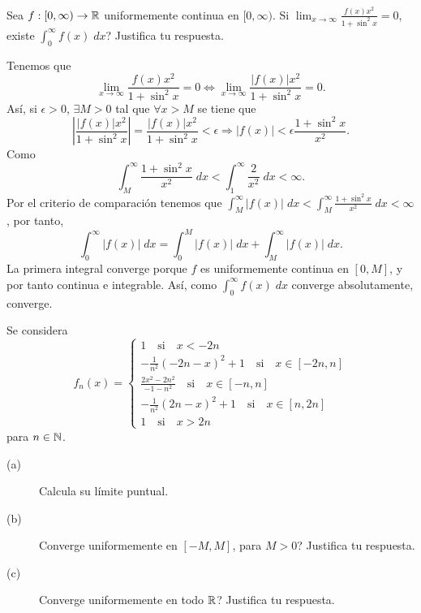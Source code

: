 \documentclass{article}
\begin{document}
\begin{ej}
Sea $\displaystyle f : [0,\infty) \to \mathbb{R} $ uniformemente continua en $\displaystyle [0,\infty) $. Si $\displaystyle \lim_{x \to \infty}\frac{f\left(x\right)x^{2}}{1 + \sin ^{2}x} = 0 $, existe $\displaystyle \int^{\infty}_{0} f\left(x\right) \; dx $? Justifica tu respuesta.
\end{ej}
\begin{sol}
Tenemos que 
\[\lim_{x \to \infty}\frac{f\left(x\right)x^{2}}{1+\sin ^{2}x } = 0 \iff \lim_{x \to \infty}\frac{ \left|f\left(x\right)\right|x^{2}}{1+ \sin ^{2}x} = 0 .\]
Así, si $\displaystyle \epsilon > 0 $, $\displaystyle \exists M > 0 $ tal que $\displaystyle \forall x > M $ se tiene que 
\[ \left|\frac{ \left|f\left(x\right)\right|x^{2}}{1+\sin ^{2}x}\right| = \frac{ \left|f\left(x\right)\right|x^{2}}{1+\sin ^{2}x} < \epsilon \Rightarrow \left|f\left(x\right)\right| < \epsilon \frac{1+ \sin ^{2}x}{x^{2}}.\]
Como 
\[\int^{\infty}_{M} \frac{1 + \sin ^{2}x}{x^{2}} \; dx < \int^{\infty}_{1} \frac{2}{x^{2}} \; dx < \infty .\]
Por el criterio de comparación tenemos que $\displaystyle \int^{\infty}_{M} \left|f\left(x\right)\right| \; dx < \int^{\infty}_{M} \frac{1+\sin ^{2}x}{x^{2}} \; dx < \infty $, por tanto, 
\[\int^{\infty}_{0} \left|f\left(x\right)\right| \; dx = \int^{M}_{0} \left|f\left(x\right)\right| \; dx + \int^{\infty}_{M} \left|f\left(x\right)\right| \; dx .\]
La primera integral converge porque $\displaystyle f $ es uniformemente continua en $\displaystyle [0,M] $, y por tanto continua e integrable. Así, como $\displaystyle \int^{\infty}_{0} f\left(x\right) \; dx $ converge absolutamente, converge.
\end{sol}
\begin{ej}
Se considera 
\[f_{n}\left(x\right) = 
\begin{cases}
1 \quad \text{si} \quad x < - 2n \\
-\frac{1}{n^{2}}\left(-2n-x\right)^{2}+1 \quad \text{si} \quad x \in \left[-2n,n\right] \\
\frac{2x^{2}-2n^{2}}{-1-n^{2}} \quad \text{si} \quad x \in \left[-n,n\right] \\
-\frac{1}{n^{2}}\left(2n-x\right)^{2}+1 \quad \text{si} \quad x \in \left[n, 2n\right] \\
1 \quad \text{si} \quad x > 2n
\end{cases}
\]
para $\displaystyle n \in \mathbb{N} $.
\begin{description}
\item[(a)] Calcula su límite puntual.
\item[(b)] Converge uniformemente en $\displaystyle \left[-M,M\right]  $, para $\displaystyle M > 0 $? Justifica tu respuesta.
\item[(c)] Converge uniformemente en todo $\displaystyle \mathbb{R} $? Justifica tu respuesta.
\end{description}
\end{ej}
\end{document}
